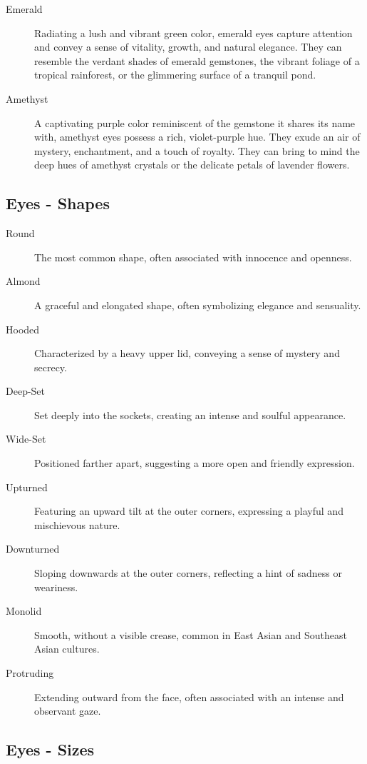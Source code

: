 \begin{description}
    \item[Emerald] Radiating a lush and vibrant green color, emerald eyes capture attention and convey a sense of vitality, growth, and natural elegance. They can resemble the verdant shades of emerald gemstones, the vibrant foliage of a tropical rainforest, or the glimmering surface of a tranquil pond.
    \item[Amethyst] A captivating purple color reminiscent of the gemstone it shares its name with, amethyst eyes possess a rich, violet-purple hue. They exude an air of mystery, enchantment, and a touch of royalty. They can bring to mind the deep hues of amethyst crystals or the delicate petals of lavender flowers.
\end{description}

\subsection{\textbf{Eyes - Shapes}}

\begin{description}
    \item[Round] The most common shape, often associated with innocence and openness.
    \item[Almond] A graceful and elongated shape, often symbolizing elegance and sensuality.
    \item[Hooded] Characterized by a heavy upper lid, conveying a sense of mystery and secrecy.
    \item[Deep-Set] Set deeply into the sockets, creating an intense and soulful appearance.
    \item[Wide-Set] Positioned farther apart, suggesting a more open and friendly expression.
    \item[Upturned] Featuring an upward tilt at the outer corners, expressing a playful and mischievous nature.
    \item[Downturned] Sloping downwards at the outer corners, reflecting a hint of sadness or weariness.
    \item[Monolid] Smooth, without a visible crease, common in East Asian and Southeast Asian cultures.
    \item[Protruding] Extending outward from the face, often associated with an intense and observant gaze.
\end{description}

\subsection{\textbf{Eyes - Sizes}}

